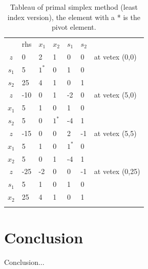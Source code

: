 \documentclass[11pt]{article}
\begin{document}
\begin{table}[H]
\caption{Tableau of primal simplex method (least index version), the element with a * is the pivot element. }
\label{Table: tableau}
\centering
\begin{tabular}{c|llllll}
   & rhs & $x_1$ & $x_2$ & $s_1$ & $s_2$ &                 \\ \cline{1-6}
$z$  & 0   & 2  & 1  & 0  & 0  & at vetex (0,0)  \\
$s_1$ & 5   & $1^*$  & 0  & 1  & 0  &                 \\
$s_2$ & 25  & 4  & 1  & 0  & 1  &                 \\ \hhline{======}
$z$  & -10 & 0  & 1  & -2 & 0  & at vetex (5,0)  \\
$x_1$ & 5   & 1  & 0  & 1  & 0  &                 \\
$s_2$ & 5   & 0  & $1^*$  & -4 & 1  &                 \\ \hhline{======}
$z$  & -15 & 0  & 0  & 2  & -1 & at vetex (5,5)  \\
$x_1$ & 5   & 1  & 0  & $1^*$  & 0  &                 \\
$x_2$ & 5   & 0  & 1  & -4 & 1  &                 \\ \hhline{======}
$z$  & -25 & -2 & 0  & 0  & -1 & at vetex (0,25) \\
$s_1$ & 5   & 1  & 0  & 1  & 0  &                 \\
$x_2$ & 25  & 4  & 1  & 0  & 1  &                 \\ \hhline{======}
\end{tabular}
\end{table}




\section{Conclusion}
Conclusion...


 
\end{document}
